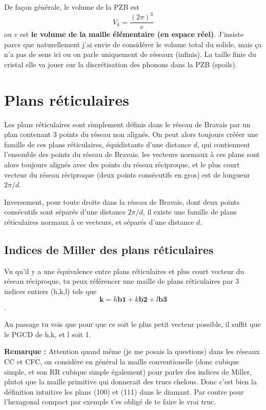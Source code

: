 \documentclass[a4paper]{report}
\begin{document}
  De façon générale, le volume de la PZB est $$V_k = \frac{(2\pi)^3}{v}$$ ou $v$ est \textbf{le volume de la maille élémentaire (en espace réel)}. J'insiste parce que naturellement j'ai envie de considérer le volume total du solide, mais ça n'a pas de sens ici ou on parle uniquement de réseaux (infinis). La taille finie du cristal elle va jouer sur la discrétisation des phonons dans la PZB (spoils).
  \section{Plans réticulaires}
  Les plans réticulaires sont simplement définis dans le réseau de Bravais par un plan contenant 3 points du réseau non alignés. On peut alors toujours crééer une famille de ces plans réticulaires, équidistants d'une distance $d$, qui contiennent l'ensemble des points du réseau de Bravais. les vecteurs normaux à ces plans sont alors toujours alignés avec des points du réseau réciproque, et le plus court vecteur du réseau réciproque (deux points consécutifs en gros) est de longueur $2\pi/d$.
  
  Inversement, pour toute droite dans la réseau de Bravais, dont deux points consécutifs sont séparés d'une distance $2\pi/d$, il existe une famille de plans réticulaires normaux à ce vecteurs, et séparés d'une distance $d$.
  \subsection{Indices de Miller des plans réticulaires}
  Vu qu'il y a une équivalence entre plans réticulaires et plus court vecteur du réseau réciproque, tu peux référencer une maille de plans réticulaires par 3 indices entiers (h,k,l) tels que $$ \mathbf{k} = h \mathbf{b1} + k \mathbf{b2} + l \mathbf{b3} $$.
  
  Au passage tu vois que pour que ce soit le plus petit vecteur possible, il suffit que le PGCD de h,k, et l soit 1.
  
  \textbf{Remarque :} Attention quand même (je me posais la questions) dans les réseaux CC et CFC, on considère en général la maille conventionelle (donc cubique simple, et son RR cubique simple également) pour parler des indices de Miller, plutot que la maille primitive qui donnerait des trucs chelous. Donc c'est bien la définition intuitive les plans (100) et (111) dans le diamant. Par contre pour l'hexagonal compact par exemple t'es obligé de te faire le vrai truc.
  
\end{document}
